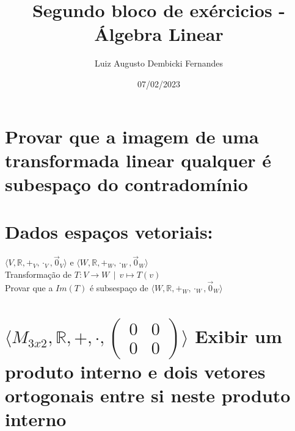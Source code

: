 \documentclass[12pt, twoside, a4]{article} %
\begin{document}
\title{Segundo bloco de exércicios - Álgebra Linear}
\author{Luiz Augusto Dembicki Fernandes}
\date{07/02/2023}
\maketitle

\section{Provar que a imagem de uma transformada linear qualquer é subespaço do contradomínio}

\section{Dados espaços vetoriais:}
\begin{doublespacing}
    \begin{large}
         \begin{bf}

            $\langle V, \mathbb{R}, +_V, \cdot_V, \overrightarrow{0}_V  \rangle $ e 
           $\langle W, \mathbb{R}, +_W, \cdot_W, \overrightarrow{0}_W  \rangle $ \\
           Transformação de $ T: V \to W \ \ | \ \ v \mapsto T(v) $ \\
           Provar que a $ Im(T) $ é subsespaço de $\langle W, \mathbb{R}, +_W, \cdot_W, \overrightarrow{0}_W  \rangle $
        
        \end{bf}
    \end{large}
\end{doublespacing}



\section{$\langle M_{3x2}, \mathbb{R}, +, \cdot, 
\begin{pmatrix} 
 0 & 0 \\
 0 & 0 
\end{pmatrix} \rangle 
$ Exibir um produto interno e dois vetores ortogonais entre si neste produto interno}
\end{document}
